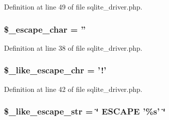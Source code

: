 Definition at line 49 of file sqlite\-\_\-driver.\-php.

\hypertarget{class_c_i___d_b__sqlite__driver_aaec2fb0112850159063a8e47ad3aed6e}{
\subsubsection[{\$\-\_\-escape\-\_\-char}]{\setlength{\rightskip}{0pt plus 5cm}\$\-\_\-escape\-\_\-char = ''}}\label{class_c_i___d_b__sqlite__driver_aaec2fb0112850159063a8e47ad3aed6e}


Definition at line 38 of file sqlite\-\_\-driver.\-php.

\hypertarget{class_c_i___d_b__sqlite__driver_a668acfd923d0342389cd3a614628cf2a}{
\subsubsection[{\$\-\_\-like\-\_\-escape\-\_\-chr}]{\setlength{\rightskip}{0pt plus 5cm}\$\-\_\-like\-\_\-escape\-\_\-chr = '!'}}\label{class_c_i___d_b__sqlite__driver_a668acfd923d0342389cd3a614628cf2a}


Definition at line 42 of file sqlite\-\_\-driver.\-php.

\hypertarget{class_c_i___d_b__sqlite__driver_adf86ecadf3d0e1ce3f5e0eaeeb3867ae}{
\subsubsection[{\$\-\_\-like\-\_\-escape\-\_\-str}]{\setlength{\rightskip}{0pt plus 5cm}\$\-\_\-like\-\_\-escape\-\_\-str = \char`\"{} E\-S\-C\-A\-P\-E '\%s' \char`\"{}}}\label{class_c_i___d_b__sqlite__driver_adf86ecadf3d0e1ce3f5e0eaeeb3867ae}


